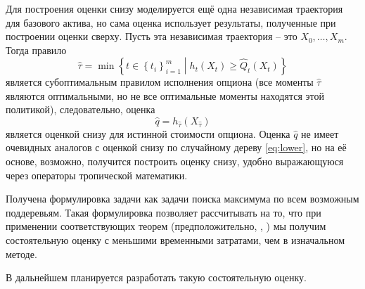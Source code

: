 \documentclass[specialist,
               substylefile = ../spbu.rtx,
               subf,href,colorlinks=true, 12pt]{disser}
\begin{document}
	Для построения оценки снизу моделируется ещё одна независимая траектория для базового актива, но сама оценка использует результаты, полученные при построении оценки сверху. Пусть эта независимая траектория -- это $X_0, \ldots, X_m$. Тогда правило \begin{equation*}
		\hat\tau = \min\left\lbrace t\in\left\lbrace t_i\right\rbrace_{i=1}^m \middle\vert h_t\left(X_t\right) \geqslant \hat Q_t\left(X_t\right) \right\rbrace
	\end{equation*}
	является субоптимальным правилом исполнения опциона (все моменты $\hat\tau$ являются оптимальными, но не все оптимальные моменты находятся этой политикой), следовательно, оценка
	\begin{equation}
	\hat q = h_{\hat\tau}\left(X_{\hat\tau}\right)
	\end{equation}
	является оценкой снизу для истинной стоимости опциона. Оценка $\hat q$ не имеет очевидных аналогов с оценкой снизу по случайному дереву \eqref{eq:lower}, но на её основе, возможно, получится построить оценку снизу, удобно выражающуюся через операторы тропической математики.

\conclusion
	Получена формулировка задачи как задачи поиска максимума по всем возможным поддеревьям. Такая формулировка позволяет рассчитывать на то, что при применении соответствующих теорем (предположительно, \cite{Nevzorov2000}, \cite{Zhigljavsky2008}) мы получим состоятельную оценку с меньшими временными затратами, чем в изначальном методе.

	В дальнейшем планируется разработать такую состоятельную оценку.



\end{document}
